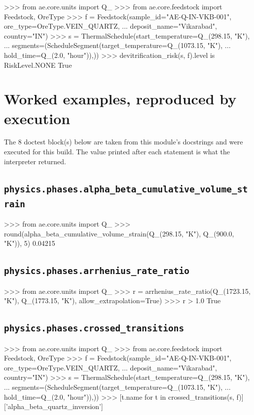 \documentclass[10pt,a4paper,twoside]{report}
\begin{document}
\begin{doctestblock}
>>> from ae.core.units import Q_
>>> from ae.core.feedstock import Feedstock, OreType
>>> f = Feedstock(sample_id="AE-Q-IN-VKB-001", ore_type=OreType.VEIN_QUARTZ,
...               deposit_name="Vikarabad", country="IN")
>>> s = ThermalSchedule(start_temperature=Q_(298.15, "K"),
...                     segments=(ScheduleSegment(target_temperature=Q_(1073.15, "K"),
...                                               hold_time=Q_(2.0, "hour")),))
>>> devitrification_risk(s, f).level is RiskLevel.NONE
True
\end{doctestblock}

\section{Worked examples, reproduced by execution}

The 8 doctest block(s) below are taken from this module's docstrings and were executed for this build. The value printed after each statement is what the interpreter returned.

\subsection*{\texttt{physics.phases.alpha\_beta\_cumulative\_volume\_strain}}

\begin{doctestblock}
>>> from ae.core.units import Q_
>>> round(alpha_beta_cumulative_volume_strain(Q_(298.15, "K"), Q_(900.0, "K")), 5)
0.04215
\end{doctestblock}

\subsection*{\texttt{physics.phases.arrhenius\_rate\_ratio}}

\begin{doctestblock}
>>> from ae.core.units import Q_
>>> r = arrhenius_rate_ratio(Q_(1723.15, "K"), Q_(1773.15, "K"), allow_extrapolation=True)
>>> r > 1.0
True
\end{doctestblock}

\subsection*{\texttt{physics.phases.crossed\_transitions}}

\begin{doctestblock}
>>> from ae.core.units import Q_
>>> from ae.core.feedstock import Feedstock, OreType
>>> f = Feedstock(sample_id="AE-Q-IN-VKB-001", ore_type=OreType.VEIN_QUARTZ,
...               deposit_name="Vikarabad", country="IN")
>>> s = ThermalSchedule(start_temperature=Q_(298.15, "K"),
...                     segments=(ScheduleSegment(target_temperature=Q_(1073.15, "K"),
...                                               hold_time=Q_(2.0, "hour")),))
>>> [t.name for t in crossed_transitions(s, f)]
['alpha_beta_quartz_inversion']
\end{doctestblock}
\end{document}
